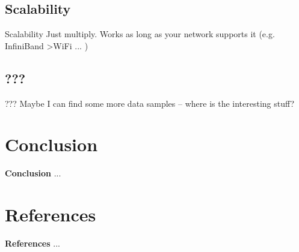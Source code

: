 \documentclass[compress,t]{beamer}
\begin{document}
\subsection{Scalability}
\begin{frame}{Scalability}
    Just multiply. Works as long as your network supports it (e.g. InfiniBand \textgreater WiFi ... )
\end{frame}

\subsection{???}
\begin{frame}{???}
    Maybe I can find some more data samples -- where is the interesting stuff?
\end{frame}


\section{Conclusion}

\begin{frame}{\textbf{Conclusion}}
    ...
\end{frame}


\section{References}

\begin{frame}{\textbf{References}}
    ...
\end{frame}

\end{document}
